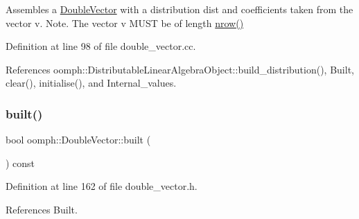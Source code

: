 Assembles a \hyperlink{classoomph_1_1DoubleVector}{Double\+Vector} with a distribution dist and coefficients taken from the vector v. Note. The vector v M\+U\+ST be of length \hyperlink{classoomph_1_1DistributableLinearAlgebraObject_a7569556f14fd68b28508920e89bd5eee}{nrow()} 



Definition at line 98 of file double\+\_\+vector.\+cc.



References oomph\+::\+Distributable\+Linear\+Algebra\+Object\+::build\+\_\+distribution(), Built, clear(), initialise(), and Internal\+\_\+values.

\mbox{\label{classoomph_1_1DoubleVector_aae402d422ec4344a4a45cdb7659b7161}} 
\subsubsection{\texorpdfstring{built()}{built()}}
{\footnotesize\ttfamily bool oomph\+::\+Double\+Vector\+::built (\begin{DoxyParamCaption}{ }\end{DoxyParamCaption}) const\hspace{0.3cm}{\ttfamily [inline]}}



Definition at line 162 of file double\+\_\+vector.\+h.



References Built.



